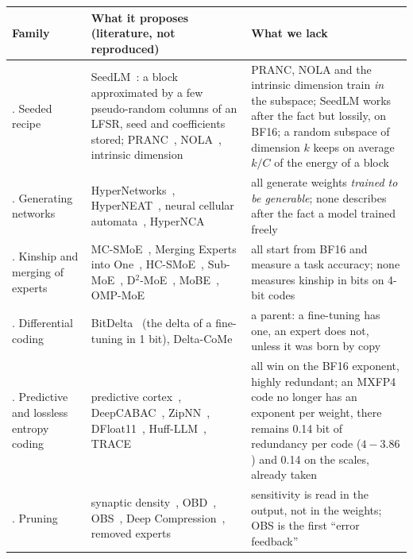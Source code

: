 \begin{table}[p]
\centering\scriptsize
\renewcommand{\arraystretch}{1.15}
\begin{tabularx}{\linewidth}{>{\raggedright\arraybackslash}p{2.3cm} >{\raggedright\arraybackslash}X >{\raggedright\arraybackslash}X}
\toprule
Family & What it proposes (literature, not reproduced) & What we lack \\
\midrule
1. Seeded recipe & SeedLM~\cite{shafipour2024seedlm}: a block approximated by a few pseudo-random columns of an LFSR, seed and coefficients stored; PRANC~\cite{nooralinejad2022pranc}, NOLA~\cite{koohpayegani2023nola}, intrinsic dimension~\cite{li2018intrinsic} & PRANC, NOLA and the intrinsic dimension train \emph{in} the subspace; SeedLM works after the fact but lossily, on BF16; a random subspace of dimension $k$ keeps on average $k/C$ of the energy of a block \\
2. Generating networks & HyperNetworks~\cite{ha2016hypernetworks}, HyperNEAT~\cite{stanley2009hyperneat}, neural cellular automata~\cite{mordvintsev2020nca}, HyperNCA~\cite{najarro2022hypernca} & all generate weights \emph{trained to be generable}; none describes after the fact a model trained freely \\
3. Kinship and merging of experts & MC-SMoE~\cite{li2023mcsmoe}, Merging Experts into One~\cite{he2023meo}, HC-SMoE~\cite{chen2024hcsmoe}, Sub-MoE~\cite{li2025submoe}, D$^2$-MoE~\cite{gu2025d2moe}, MoBE~\cite{chen2025mobe}, OMP-MoE~\cite{li2026ompmoe} & all start from BF16 and measure a task accuracy; none measures kinship in bits on 4-bit codes \\
4. Differential coding & BitDelta~\cite{liu2024bitdelta} (the delta of a fine-tuning in 1 bit), Delta-CoMe~\cite{ping2024deltacome} & a parent: a fine-tuning has one, an expert does not, unless it was born by copy \\
5. Predictive and lossless entropy coding & predictive cortex~\cite{rao1999}, DeepCABAC~\cite{wiedemann2019deepcabac}, ZipNN~\cite{hershcovitch2024zipnn}, DFloat11~\cite{zhang2025dfloat11}, Huff-LLM~\cite{yubeaton2025huffllm}, TRACE~\cite{xie2025trace} & all win on the BF16 exponent, highly redundant; an MXFP4 code no longer has an exponent per weight, there remains 0.14 bit of redundancy per code ($4 - 3.86$) and 0.14 on the scales, already taken \\
6. Pruning & synaptic density~\cite{huttenlocher1979}, OBD~\cite{lecun1989obd}, OBS~\cite{hassibi1992obs}, Deep Compression~\cite{han2015deepcompression}, removed experts~\cite{lu2024notallexperts,martin2026ests} & sensitivity is read in the output, not in the weights; OBS is the first ``error feedback'' \\

\end{tabularx}
\end{table}
